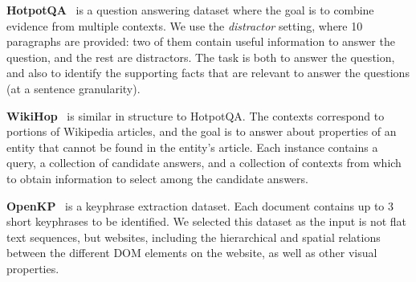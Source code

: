 \documentclass[11pt,a4paper]{article}
\begin{document}
{\bf HotpotQA}~\cite{yang2018hotpotqa} is a question answering dataset where the goal is to combine evidence from multiple contexts. We use the {\em distractor} setting, where 10 paragraphs are provided: two of them contain useful information to answer the question, and the rest are distractors. The task is both to answer the question, and also to identify the supporting facts that are relevant to answer the questions (at a sentence granularity). 

{\bf WikiHop}~\cite{welbl2018constructing} is similar in structure to HotpotQA. The contexts correspond to portions of Wikipedia articles, and the goal is to answer about properties of an entity that cannot be found in the entity's article. Each instance contains a query, a collection of candidate answers, and a collection of contexts from which to obtain information to select among the candidate answers.

{\bf OpenKP}~\cite{xiong2019open} is a keyphrase extraction dataset. Each document contains up to 3 short keyphrases to be identified. We selected this dataset as the input is not flat text sequences, but websites, including the hierarchical and spatial relations between the different DOM elements on the website, as well as other visual properties.



\begin{table}[tb]\centering 
{}
\caption{Dataset stats (length in word piece tokens).}
\label{tbl:datasets} 
\end{table}
\end{document}
